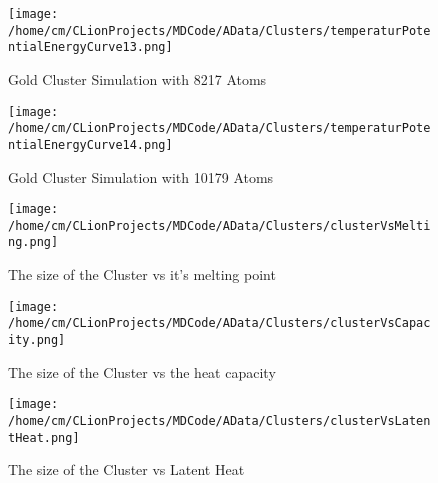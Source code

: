 \begin{figure}[!h] 
    \begin{center} 
        \texttt{[image: /home/cm/CLionProjects/MDCode/AData/Clusters/temperaturPotentialEnergyCurve13.png]} 
    \end{center} 
    \caption[Gold Cluster Simulation with 8217 Atoms]{Gold Cluster Simulation with 8217 Atoms} 
    \label{GoldClusterSimulationTemperaturEnergy8217} 
\end{figure} 
 
\begin{figure}[!h] 
    \begin{center} 
        \texttt{[image: /home/cm/CLionProjects/MDCode/AData/Clusters/temperaturPotentialEnergyCurve14.png]} 
    \end{center} 
    \caption[Gold Cluster Simulation with 10179 Atoms]{Gold Cluster Simulation with 10179 Atoms} 
    \label{GoldClusterSimulationTemperaturEnergy10179} 
\end{figure} 
 
\begin{figure}[!h] 
    \begin{center} 
        \texttt{[image: /home/cm/CLionProjects/MDCode/AData/Clusters/clusterVsMelting.png]} 
    \end{center} 
    \caption[The size of the Cluster vs it's melting point]{The size of the Cluster vs it's melting point} 
    \label{clusterVsMelting} 
\end{figure} 
 
\begin{figure}[!h] 
    \begin{center} 
        \texttt{[image: /home/cm/CLionProjects/MDCode/AData/Clusters/clusterVsCapacity.png]} 
    \end{center} 
    \caption[The size of the Cluster vs the heat capacity]{The size of the Cluster vs the heat capacity} 
    \label{clusterVsCapacity} 
\end{figure} 
 
\begin{figure}[!h] 
    \begin{center} 
        \texttt{[image: /home/cm/CLionProjects/MDCode/AData/Clusters/clusterVsLatentHeat.png]} 
    \end{center} 
    \caption[The size of the Cluster vs Latent Heat]{The size of the Cluster vs Latent Heat} 
    \label{clusterVsLatentHeat} 
\end{figure} 
 
